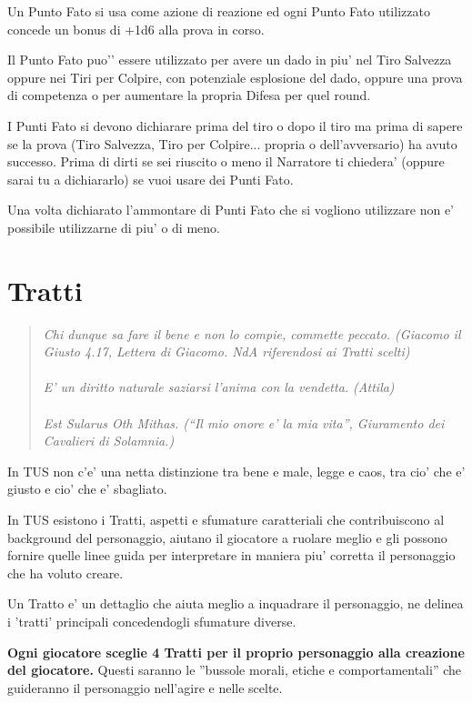 \documentclass[a4paper,11pt,twoside,openany]{book}
\begin{document}
Un Punto Fato si usa come azione di reazione ed ogni Punto Fato utilizzato concede un bonus di +1d6 alla prova in corso. 

Il Punto Fato puo'’ essere utilizzato per avere un dado in piu' nel Tiro Salvezza oppure nei Tiri per Colpire, con potenziale esplosione del dado, oppure una prova di competenza o per aumentare la propria Difesa per quel round.

I Punti Fato si devono dichiarare prima del tiro o dopo il tiro ma prima di sapere se la prova (Tiro Salvezza, Tiro per Colpire... propria o dell’avversario) ha avuto successo. 
Prima di dirti se sei riuscito o meno il Narratore ti chiedera’ (oppure sarai tu a dichiararlo) se vuoi usare dei Punti Fato.

Una volta dichiarato l’ammontare di Punti Fato che si vogliono utilizzare non e’ possibile utilizzarne di piu' o di meno.

\section{Tratti}

\label{tratti}
\begin{quote}\textit{
Chi dunque sa fare il bene e non lo compie, commette peccato. (Giacomo il Giusto 4.17, Lettera di Giacomo. NdA riferendosi ai Tratti scelti)\\\\
E' un diritto naturale saziarsi l'anima con la vendetta. (Attila)\\\\
Est Sularus Oth Mithas. (“Il mio onore e' la mia vita”, Giuramento dei Cavalieri di Solamnia.)}\end{quote}

In TUS non c'e' una netta distinzione tra bene e male, legge e caos, tra cio' che e' giusto e cio' che e' sbagliato.

In TUS esistono i Tratti, aspetti e sfumature caratteriali che contribuiscono al background del personaggio, aiutano il giocatore a ruolare meglio e gli possono fornire quelle linee guida per interpretare in maniera piu' corretta il personaggio che ha voluto creare.

Un Tratto e' un dettaglio che aiuta meglio a inquadrare il personaggio, ne delinea i 'tratti' principali concedendogli sfumature diverse.

\textbf{Ogni giocatore sceglie 4 Tratti per il proprio personaggio alla creazione del giocatore.} Questi saranno le ''bussole morali, etiche e comportamentali'' che guideranno il personaggio nell'agire e nelle scelte.
\end{document}
